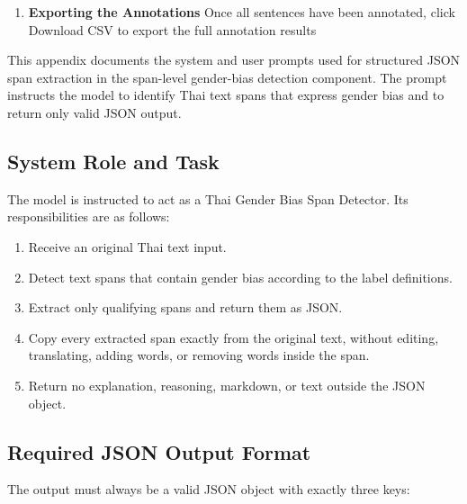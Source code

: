 \documentclass[12pt,oneside,openright,a4paper]{cpe-english-project}
\begin{document}
\begin{enumerate}
\setlength{\itemsep}{0.15\baselineskip}
\setlength{\parsep}{0pt}
\setlength{\parskip}{0pt}
\def\labelenumi{\arabic{enumi})}
\setcounter{enumi}{6}
\item
  \textbf{Exporting the Annotations}
  Once all sentences have been annotated, click Download CSV to export
  the full annotation results
\end{enumerate}

\par\medskip

This appendix documents the system and user prompts used for structured
JSON span extraction in the span-level gender-bias detection component.
The prompt instructs the model to identify Thai text spans that express
gender bias and to return only valid JSON output.

\subsection{System Role and Task}

The model is instructed to act as a Thai Gender Bias Span Detector. Its
responsibilities are as follows:

\begin{enumerate}
\setlength{\itemsep}{0.15\baselineskip}
\setlength{\parsep}{0pt}
\setlength{\parskip}{0pt}
\item Receive an original Thai text input.
\item Detect text spans that contain gender bias according to the label
definitions.
\item Extract only qualifying spans and return them as JSON.
\item Copy every extracted span exactly from the original text, without
editing, translating, adding words, or removing words inside the span.
\item Return no explanation, reasoning, markdown, or text outside the JSON
object.
\end{enumerate}

\subsection{Required JSON Output Format}

The output must always be a valid JSON object with exactly three keys:
\end{document}
